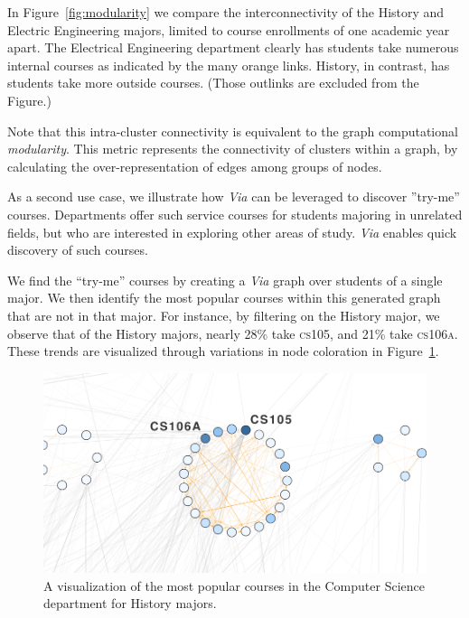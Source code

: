In Figure~\ref{fig:modularity} we compare the interconnectivity of
the History and Electric Engineering majors, limited to course
enrollments of one academic year apart. The Electrical Engineering
department clearly has students take numerous internal courses as
indicated by the many orange links. History, in contrast, has students
take more outside courses. (Those outlinks are excluded from the
Figure.)

Note that this intra-cluster connectivity is equivalent to the graph
computational {\em modularity}. This metric represents the connectivity
of clusters within a graph, by calculating the over-representation of
edges among groups of nodes.

As a second use case, we illustrate how \textit{Via} can be leveraged
to discover ''try-me'' courses. Departments offer such service courses
for students majoring in unrelated fields, but who are interested in
exploring other areas of study. {\em Via} enables quick discovery of
such courses.

We find the ``try-me'' courses by creating a {\em Via} graph over
students of a single major. We then identify the most popular courses
within this generated graph that are not in that major. For instance,
by filtering on the History major, we observe that of the History
majors, nearly 28\% take \textsc{cs105}, and 21\% take
\textsc{cs106a}. These trends are visualized through variations in
node coloration in Figure~\ref{fig:history-try-me}.

\begin{figure}[h]
    \centering
    \includegraphics[width=.9\columnwidth]{Figs/final-history-try-me.pdf}
    \caption{A visualization of the most popular courses in the Computer Science department for History majors.}
    \label{fig:history-try-me}
\end{figure}

